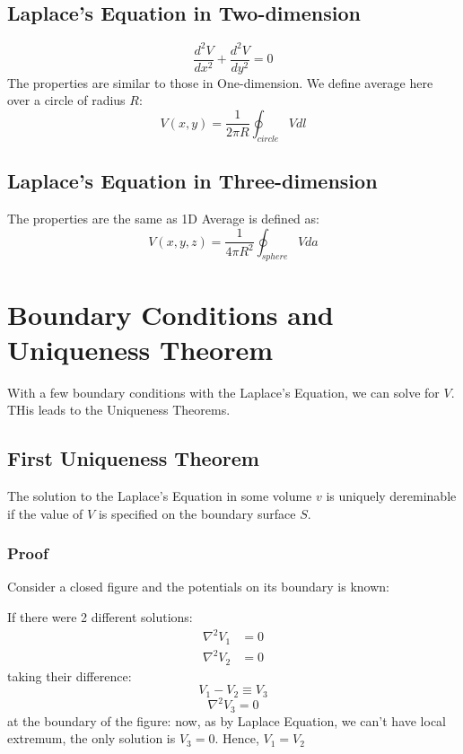 \documentclass{article}
\begin{document}
\subsection{Laplace's Equation in Two-dimension}
\[ \frac{d^2 V}{dx^2} + \frac{d^2 V}{dy^2} = 0\]
The properties are similar to those in One-dimension.
We define average here over a circle of radius $R$:
\[ V(x,y) = \frac{1}{2 \pi R} \oint_{circle} V dl\]
\subsection{Laplace's Equation in Three-dimension}
The properties are the same as 1D
Average is defined as:
\[ V(x,y,z) = \frac{1}{4 \pi R^2} \oint_{sphere} V da\]

\section{Boundary Conditions and Uniqueness Theorem}
With a few boundary conditions with the Laplace's Equation, we can solve for $V$. THis leads to the Uniqueness Theorems.

\subsection{First Uniqueness Theorem}
The solution to the Laplace's Equation in some volume $v$ is uniquely dereminable if the value of $V$ is specified on the boundary surface $S$.
\subsubsection*{Proof}
Consider a closed figure and the potentials on its boundary is known:\\

If there were 2 different solutions:
\begin{align*}
    \nabla^2 V_1 &= 0\\
    \nabla^2 V_2 &= 0
\end{align*}
taking their difference:
\[ V_1 - V_2 \equiv V_3 \]
\[ \nabla^2 V_3 = 0 \]
at the boundary of the figure:
now, as by Laplace Equation, we can't have local extremum, the only solution is \(V_3 = 0\).
Hence, \(V_1 = V_2\)
\end{document}
